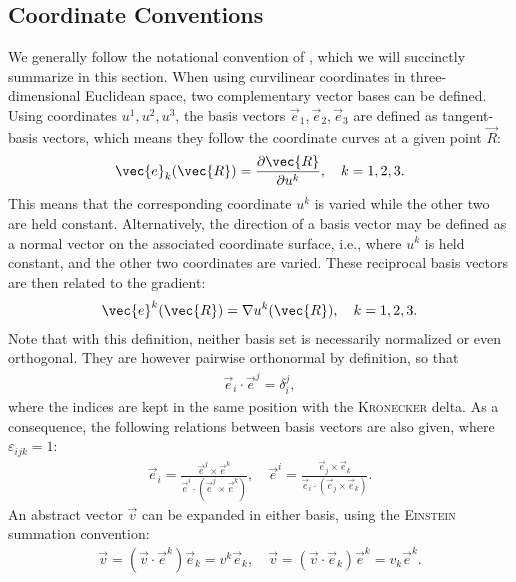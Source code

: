 \subsection{Coordinate Conventions}
\label{sec:cocos}

We generally follow the notational convention of \textcite{dHaeseleer91}, which we will succinctly summarize in this section. When using curvilinear coordinates in three-dimensional Euclidean space, two complementary vector bases can be defined. Using coordinates $u^{1}, u^{2}, u^{3}$, the basis vectors $\vec{e}_{1}, \vec{e}_{2}, \vec{e}_{3}$ are defined as tangent-basis vectors, which means they follow the coordinate curves at a given point $\vec{R}$:
\begin{gather}
  \vec{e}_{k} (\vec{R}) = \pd[\vec{R}]{u^{k}}, \quad k = 1, 2, 3.
\end{gather}
This means that the corresponding coordinate $u^{k}$ is varied while the other two are held constant. Alternatively, the direction of a basis vector may be defined as a normal vector on the associated coordinate surface, i.e., where $u^{k}$ is held constant, and the other two coordinates are varied. These reciprocal basis vectors are then related to the gradient:
\begin{gather}
  \vec{e}^{k} (\vec{R}) = \grad u^{k} (\vec{R}), \quad k = 1, 2, 3.
\end{gather}
Note that with this definition, neither basis set is necessarily normalized or even orthogonal. They are however pairwise orthonormal by definition, so that
\begin{gather}
  \vec{e}_{i} \cdot \vec{e}^{j} = \delta_{i}^{j},
\end{gather}
where the indices are kept in the same position with the \textsc{Kronecker} delta. As a consequence, the following relations between basis vectors are also given, where $\varepsilon_{ijk} = 1$:
\begin{gather}
  \vec{e}_{i} = \frac{\vec{e}^{j} \times \vec{e}^{k}}{\vec{e}^{i} \cdot (\vec{e}^{j} \times \vec{e}^{k})}, \quad \vec{e}^{i} = \frac{\vec{e}_{j} \times \vec{e}_{k}}{\vec{e}_{i} \cdot (\vec{e}_{j} \times \vec{e}_{k})}.
\end{gather}
An abstract vector $\vec{v}$ can be expanded in either basis, using the \textsc{Einstein} summation convention:
\begin{gather}
  \vec{v} = (\vec{v} \cdot \vec{e}^{k}) \vec{e}_{k} = v^{k} \vec{e}_{k}, \quad \vec{v} = (\vec{v} \cdot \vec{e}_{k}) \vec{e}^{k} = v_{k} \vec{e}^{k}.
\end{gather}
